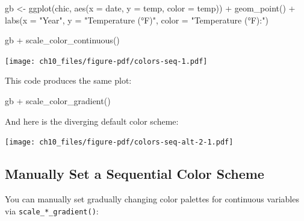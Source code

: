 \documentclass[
  letterpaper,
  DIV=11,
  numbers=noendperiod]{scrreprt}
\newenvironment{Shaded}{\begin{snugshade}}{\end{snugshade}}
\newcommand{\AttributeTok}[1]{\textcolor[rgb]{0.40,0.45,0.13}{#1}}
\newcommand{\DocumentationTok}[1]{\textcolor[rgb]{0.37,0.37,0.37}{\textit{#1}}}
\newcommand{\FunctionTok}[1]{\textcolor[rgb]{0.28,0.35,0.67}{#1}}
\newcommand{\NormalTok}[1]{\textcolor[rgb]{0.00,0.23,0.31}{#1}}
\newcommand{\OtherTok}[1]{\textcolor[rgb]{0.00,0.23,0.31}{#1}}
\newcommand{\SpecialCharTok}[1]{\textcolor[rgb]{0.37,0.37,0.37}{#1}}
\newcommand{\StringTok}[1]{\textcolor[rgb]{0.13,0.47,0.30}{#1}}
\begin{document}
\begin{Shaded}
\begin{Highlighting}[]
\NormalTok{gb }\OtherTok{\textless{}{-}} \FunctionTok{ggplot}\NormalTok{(chic, }\FunctionTok{aes}\NormalTok{(}\AttributeTok{x =}\NormalTok{ date, }\AttributeTok{y =}\NormalTok{ temp, }\AttributeTok{color =}\NormalTok{ temp)) }\SpecialCharTok{+}
  \FunctionTok{geom\_point}\NormalTok{() }\SpecialCharTok{+}
  \FunctionTok{labs}\NormalTok{(}\AttributeTok{x =} \StringTok{"Year"}\NormalTok{, }\AttributeTok{y =} \StringTok{"Temperature (°F)"}\NormalTok{, }\AttributeTok{color =} \StringTok{"Temperature (°F):"}\NormalTok{)}

\NormalTok{gb }\SpecialCharTok{+} \FunctionTok{scale\_color\_continuous}\NormalTok{()}
\end{Highlighting}
\end{Shaded}

\texttt{[image: ch10\_files/figure-pdf/colors-seq-1.pdf]}

This code produces the same plot:

\begin{Shaded}
\begin{Highlighting}[]
\NormalTok{gb }\SpecialCharTok{+} \FunctionTok{scale\_color\_gradient}\NormalTok{()}
\end{Highlighting}
\end{Shaded}

And here is the diverging default color scheme:

\begin{Shaded}
\end{Shaded}

\texttt{[image: ch10\_files/figure-pdf/colors-seq-alt-2-1.pdf]}

\subsection{Manually Set a Sequential Color
Scheme}\label{manually-set-a-sequential-color-scheme}

You can manually set gradually changing color palettes for continuous
variables via \texttt{scale\_*\_gradient()}:
\end{document}
